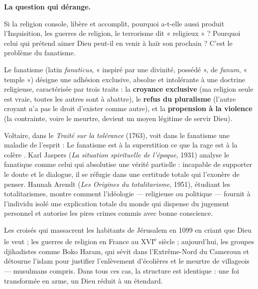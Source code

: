 \documentclass[11pt]{article}
\newcommand{\cle}[1]{{\popxbold\color{popdark}#1}}
\begin{document}
\textbf{La question qui dérange.}\par
Si la religion console, libère et accomplit, pourquoi a-t-elle aussi produit l'Inquisition, les guerres de religion, le terrorisme dit « religieux » ? Pourquoi celui qui prétend aimer Dieu peut-il en venir à haïr son prochain ? C'est le problème du \cle{fanatisme}.

\begin{definition}
Le \cle{fanatisme} (latin \emph{fanaticus}, « inspiré par une divinité, possédé », de \emph{fanum}, « temple ») désigne une adhésion exclusive, absolue et intolérante à une doctrine religieuse, caractérisée par trois traits : la \textbf{croyance exclusive} (ma religion seule est vraie, toutes les autres sont à abattre), le \textbf{refus du pluralisme} (l'autre croyant n'a pas le droit d'exister comme autre), et la \textbf{propension à la violence} (la contrainte, voire le meurtre, devient un moyen légitime de servir Dieu).
\end{definition}

Voltaire, dans le \emph{Traité sur la tolérance} (1763), voit dans le fanatisme une maladie de l'esprit : \guillemotleft Le fanatisme est à la superstition ce que la rage est à la colère \guillemotright. Karl \cle{Jaspers} (\emph{La situation spirituelle de l'époque}, 1931) analyse le fanatique comme celui qui absolutise une vérité partielle : incapable de supporter le doute et le dialogue, il se réfugie dans une certitude totale qui l'exonère de penser. Hannah \cle{Arendt} (\emph{Les Origines du totalitarisme}, 1951), étudiant les totalitarismes, montre comment l'idéologie — religieuse ou politique — fournit à l'individu isolé une explication totale du monde qui dispense du jugement personnel et autorise les pires crimes commis avec bonne conscience.

\begin{exemplebox}
Les croisés qui massacrent les habitants de Jérusalem en 1099 en criant que Dieu le veut ; les guerres de religion en France au XVI\textsuperscript{e} siècle ; aujourd'hui, les groupes djihadistes comme Boko Haram, qui sévit dans l'Extrême-Nord du Cameroun et détourne l'islam pour justifier l'enlèvement d'écolières et le meurtre de villageois — musulmans compris. Dans tous ces cas, la structure est identique : une foi transformée en arme, un Dieu réduit à un étendard.
\end{exemplebox}
\end{document}
